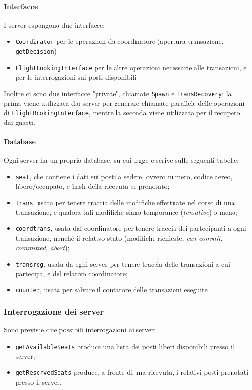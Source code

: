 \documentclass[a4paper]{article}
\begin{document}
\paragraph{Interfacce}I server espongono due interfacce:
\begin{itemize}
	\item \texttt{Coordinator} per le operazioni da coordinatore (apertura transazione, \texttt{getDecision})
	\item \texttt{FlightBookingInterface} per le altre operazioni necessarie alle transazioni, e per le interrogazioni sui posti disponibili
\end{itemize}
Inoltre ci sono due interfacce "private", chiamate \texttt{Spawn} e \texttt{TransRecovery}: la prima viene utilizzata dai server per generare chiamate parallele delle operazioni di \texttt{FlightBookingInterface}, mentre la seconda viene utilizzata per il recupero dai guasti.

\paragraph{Database}Ogni server ha un proprio database, su cui legge e scrive sulle seguenti tabelle:
\begin{itemize}
	\item \texttt{seat}, che contiene i dati sui posti a sedere, ovvero numero, codice aereo, libero/occupato, e hash della ricevuta se prenotato;
	\item \texttt{trans}, usata per tenere traccia delle modifiche effettuate nel corso di una transazione, e qualora tali modifiche siano temporanee (\textit{tentative}) o meno;
	\item \texttt{coordtrans}, usata dal coordinatore per tenere traccia dei partecipanti a ogni transazione, nonché il relativo stato (modifiche richieste, \textit{can commit}, \textit{committed}, \textit{abort});
	\item \texttt{transreg}, usata da ogni server per tenere traccia delle transazioni a cui partecipa, e del relativo coordinatore;
	\item \texttt{counter}, usata per salvare il contatore delle transazioni eseguite
\end{itemize}


\subsubsection{Interrogazione dei server}
Sono previste due possibili interrogazioni ai server:
\begin{itemize}
	\item \texttt{getAvailableSeats} produce una lista dei posti liberi disponibili presso il server;
	\item \texttt{getReservedSeats} produce, a fronte di una ricevuta, i relativi posti prenotati presso il server.
\end{itemize}
\end{document}
